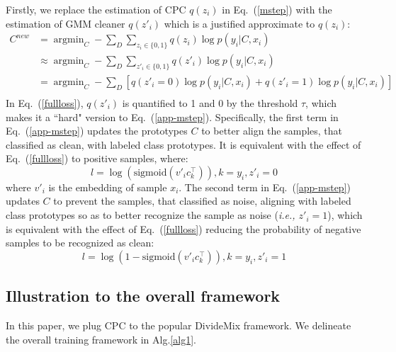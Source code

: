 \documentclass{article} \usepackage{iclr2023_conference,times}
\begin{document}
Firstly, we replace the estimation of CPC $q(z_i)$ in Eq.~(\ref{mstep}) with the estimation of GMM cleaner $q(z'_i)$ which is a justified approximate to $q(z_i)$:
\begin{equation} 
\begin{aligned} \label{app-mstep}
        C^{new} &=  \mathop{\arg\min}_{C} -   \sum_{ D} \sum_{z_i \in \{0,1\}} q(z_i) \log   p(y_i|C,x_i) \\
         & \approx \mathop{\arg\min}_{C} -   \sum_{ D} \sum_{z'_i \in \{0,1\}} q(z'_i) \log   p(y_i|C,x_i) \\
         &= \mathop{\arg\min}_{C} -   \sum_{ D} \left [ q(z'_i = 0) \log p(y_i|C,x_i) + q(z'_i = 1)\log p(y_i|C,x_i) \right] \\
\end{aligned}  
\end{equation}
 In Eq.~(\ref{fullloss}), $q(z'_i)$ is quantified to 1 and 0 by the threshold $\tau$, which makes it a ``hard" version to  Eq.~(\ref{app-mstep}). Specifically, the first term in Eq.~(\ref{app-mstep}) updates the prototypes $C$ to better align the samples, that classified as clean, with labeled class prototypes. It is equivalent with the effect of Eq.~(\ref{fullloss}) to positive samples, where:
 \begin{equation}
 l = \log(\mathrm{sigmoid}(v'_i c_k^\top)), k=y_i, z'_i=0
\end{equation}
 where $v'_i$ is the embedding of sample $x_i$.
 The second term in Eq.~(\ref{app-mstep}) updates $C$ to prevent the samples, that classified as noise, aligning with labeled class prototypes so as to better recognize the sample as noise (\emph{i.e., $z'_i=1$}), which is equivalent with the effect of Eq.~(\ref{fullloss}) reducing the probability of negative samples to be recognized as clean:
 \begin{equation}
 l = \log(1-\mathrm{sigmoid}(v'_i c_k^\top)), k=y_i, z'_i=1
\end{equation}


\subsection{Illustration to the overall framework} \label{app:alg}
In this paper, we plug CPC to the popular DivideMix framework. We delineate the overall training framework in Alg.\ref{alg1}.
\end{document}
